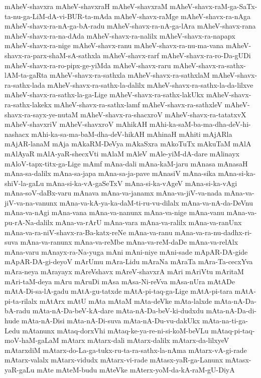 {mAheV-shavxra
mAheV-shavxraH
mAheV-shavxraM
mAheV-shavx-raM-ga-SaTx-ta-nu-ga-LiM-dA-vi-BUR-ta-mAda
mAheV-shavx-raMge
mAheV-shavx-ra-nAga
mAheV-shavx-ra-nA-ga-bA-radu
mAheV-shavx-ra-nA-ga-lAra
mAheV-shavx-rana
mAheV-shavx-ra-na-dAda
mAheV-shavx-ra-nalilx
mAheV-shavx-ra-napapx
mAheV-shavx-ra-nige
mAheV-shavx-ranu
mAheV-shavx-ra-nu-ma-vana
mAheV-shavx-ra-parx-shaM-sA-sathxla
mAheV-shavx-rarf
mAheV-shavx-ra-ro-Da-gUDi
mAheV-shavx-ra-ro-pipx-ge-yiMda
mAheV-shavx-raru
mAheV-shavx-ra-sathx-lAM-ta-gaRta
mAheV-shavx-ra-sathxla
mAheV-shavx-ra-sathxlaM
mAheV-shavx-ra-sathx-lada
mAheV-shavx-ra-sathx-la-dalilx
mAheV-shavx-ra-sathx-la-da-lilxve
mAheV-shavx-ra-sathx-la-ga-Lige
mAheV-shavx-ra-sathx-lakUkx
mAheV-shavx-ra-sathx-lakekx
mAheV-shavx-ra-sathx-lamf
mAheV-shavx-ra-sathxleV
mAheV-shavx-ra-sayx-ye-nutaM
mAheV-shavx-ra-shacxroV
mAheV-shavx-ra-tatatxvX
mAheV-shavxriV
mAheV-shavxroV
mAhikAH
mAhi-ka-saM-ba-ma-dha-deV-hi-nashacx
mAhi-ka-sa-ma-baM-dha-deV-hikAH
mAhinaH
mAhiti
mAjARla
mAjAR-lanaM
mAja
mAkaRM-DeVya
mAkaSxra
mAkoTuTx
mAkuTaM
mAlA
mAlAyaR
mAlA-yaR-shecxVti
mAlaM
mAleV
mAle-yiM-dA-dare
mAlinayx
mAloV-tapx-titx-ga-Lige
mAmf
mAna-dali
mAna-kaM-jaru
mAnasa
mAnasaH
mAna-sa-dalilx
mAna-sa-japa
mAna-sa-ja-pave
mAnasiV
mAna-sika
mAna-si-ka-shiV-la-gaLu
mAna-si-ka-vA-gaSeTxV
mAna-si-ka-vAgeV
mAna-si-ka-vAgi
mAna-soV-daBx-varu
mAnava
mAna-va-janamx
mAna-va-jiV-va-nada
mAna-va-jiV-va-na-vanunx
mAna-va-kA-ya-ka-daM-ti-ru-vu-dilalx
mAna-va-nA-da-DeVnu
mAna-va-nAgi
mAna-vana
mAna-va-nanunx
mAna-va-nige
mAna-vanu
mAna-va-pu-rA-Na-dalilx
mAna-va-rArU
mAna-vara
mAna-va-ralilx
mAna-va-ranUnx
mAna-va-ra-niV-shavx-ra-Ba-katx-reNe
mAna-va-ranu
mAna-va-ra-nu-dadhx-ri-suva
mAna-va-ranunx
mAna-va-reMbe
mAna-va-reM-daDe
mAna-va-relAlx
mAna-varu
mAnayx-ra-Na-yuga
mAni
mAni-niye
mAni-sade
mApAR-DA-gide
mApAR-DA-gi-deyoV
mArUmu
mAra-Lidu
mAraNa
mAraTa
mAra-Ta-cecxYva
mAra-neya
mArayayx
mAreVshavx
mAreV-shavxrA
mAri
mAriVtu
mAritaM
mAri-taM-deya
mAru
mAruDi
mAsa
mAsa-Ni-reVva
mAsa-nUra
mAtADe
mAtA-Di-sa-lA-gadu
mAtA-gu-tatxde
mAtA-pi-taq-ga-Lige
mAtA-pi-tara
mAtA-pi-ta-rilalx
mAtArx
mAtU
mAta
mAtaM
mAta-deVke
mAta-lalxde
mAta-nA-Da-bA-radu
mAta-nA-Da-beV-kA-dare
mAta-nA-Da-beV-ki-dudxdu
mAta-nA-Da-di-hude
mAta-nA-Disi
mAta-nA-Di-suva
mAta-nA-Du-vu-dakUkx
mAta-na-ti-ga-Ledu
mAtanunx
mAtaq-dorxVhi
mAtaq-ke-ya-re-ni-si-koM-beVLu
mAtaq-pi-taq-moV-haM-gaLaM
mAtarx
mAtarx-dali
mAtarx-dalilx
mAtarx-da-lilxyeV
mAtarxdiM
mAtarx-do-La-ga-tukx-ru-ta-ra-sathx-la-nAma
mAtarx-vA-gi-rade
mAtarx-valalx
mAtarx-vidudx
mAtarx-vi-rade
mAtasx-yaR-ga-Lanunx
mAtasx-yaR-gaLu
mAte
mAteM-budu
mAteVke
mAterx-yoM-da-kA-raM-gU-DiyA
}
